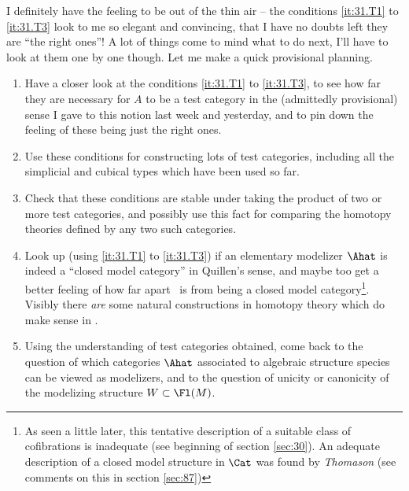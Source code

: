 \label{sec:32}%
I definitely have the feeling to be out of the thin air -- the
conditions \ref{it:31.T1} to \ref{it:31.T3} look to me so elegant and
convincing, that I have no doubts left they are ``the right ones''! A
lot of things come to mind what to do next, I'll have to look at them
one by one though. Let me make a quick provisional planning.
\begin{enumerate}[label=\arabic*)]
\item\label{it:32.1}
  Have a closer look at the conditions \ref{it:31.T1} to
  \ref{it:31.T3}, to see how far they are necessary for $A$ to be a
  test category in the (admittedly provisional) sense I gave to this
  notion last week and yesterday, and to pin down the feeling of these
  being just the right ones.
\item\label{it:32.2}
  Use these conditions for constructing lots of test categories,
  including all the simplicial and cubical types which have been used
  so far.
\item\label{it:32.3}
  Check that these conditions are stable under taking the product
  of two or more test categories, and possibly use this fact for
  comparing the homotopy theories defined by any two such categories.
\item\label{it:32.4}
  Look up (using \ref{it:31.T1} to \ref{it:31.T3}) if an
  elementary modelizer $\Ahat$ is indeed a ``closed model
  category'' in Quillen's sense, and maybe too get a better feeling of
  how far apart \Cat\ is from being a closed model category\footnote{As seen a little later, this tentative description of a suitable class of cofibrations is inadequate (see beginning of section \ref{sec:30}). An adequate description of a closed model structure in $\Cat$ was found by \emph{Thomason} (see comments on this in section \ref{sec:87})}. Visibly
  there \emph{are} some natural constructions in homotopy theory which
  do make sense in \Cat.
\item\label{it:32.5}
  Using the understanding of test categories obtained, come back
  to the question of which categories $\Ahat$ associated to
  algebraic structure species can be viewed as modelizers, and to the
  question of unicity or canonicity of the modelizing structure $W
  \subset \Fl(M)$.
\end{enumerate}

